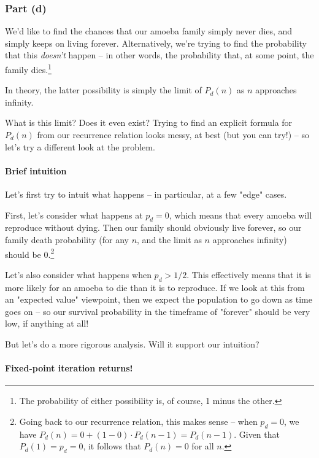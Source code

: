 
\subsubsection{Part (d)}

We'd like to find the chances that our amoeba family simply never dies, and simply keeps on living forever. Alternatively, we're trying to find the probability that this \emph{doesn't} happen -- in other words, the probability that, at some point, the family dies.\footnote{The probability of either possibility is, of course, 1 minus the other.}

In theory, the latter possibility is simply the limit of $P_d(n)$ as $n$ approaches infinity. 

What is this limit? Does it even exist? Trying to find an explicit formula for $P_d(n)$ from our recurrence relation looks messy, at best (but you can try!) -- so let's try a different look at the problem.


\paragraph{Brief intuition}

Let's first try to intuit what happens -- in particular, at a few "edge" cases.

First, let's consider what happens at $p_d = 0$, which means that every amoeba will reproduce without dying. Then our family should obviously live forever, so our family death probability (for any $n$, and the limit as $n$ approaches infinity) should be 0.\footnote{Going back to our recurrence relation, this makes sense -- when $p_d = 0$, we have $P_d(n) = 0 + (1 - 0) \cdot P_d(n-1) = P_d(n-1)$. Given that $P_d(1) = p_d = 0$, it follows that $P_d(n) = 0$ for all $n$.}

Let's also consider what happens when $p_d > 1/2$. This effectively means that it is more likely for an amoeba to die than it is to reproduce. If we look at this from an "expected value" viewpoint, then we expect the population to go down as time goes on -- so our survival probability in the timeframe of "forever" should be very low, if anything at all!

But let's do a more rigorous analysis. Will it support our intuition?


\paragraph{Fixed-point iteration returns!}

